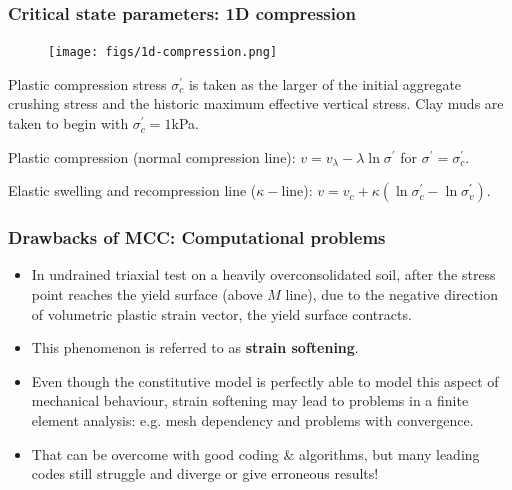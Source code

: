 \documentclass[notes]{beamer}
\begin{document}
\begin{frame}
	\frametitle{Critical state parameters: 1D compression}
	\begin{figure}
		\texttt{[image: figs/1d-compression.png]}
	\end{figure}
	Plastic compression stress $\sigma_c^\prime$ is taken as the larger of the initial aggregate crushing stress and the historic maximum effective vertical stress. Clay muds are taken to begin with $\sigma_c^\prime = 1$kPa.
	
	Plastic compression (normal compression line): $v = v_\lambda - \lambda \ln \sigma^\prime$ for $\sigma^\prime = \sigma^\prime_c$.
	
	Elastic swelling and recompression line ($\kappa-$line): $ v = v_c + \kappa (\ln \sigma_c^\prime - \ln \sigma_v^\prime)$. 
\end{frame}

\begin{frame}
\frametitle{Drawbacks of MCC: Computational problems}
\begin{itemize}
	\item In undrained triaxial test on a heavily overconsolidated soil, after the stress point reaches the yield surface (above $M$ line), due to the negative direction of volumetric plastic strain vector, the yield surface contracts.
	
	\item This phenomenon is referred to as \textbf{strain softening}.

	\item Even though the constitutive model is perfectly able to model this
	aspect of mechanical behaviour, strain softening may lead to problems in a finite element analysis: e.g. mesh dependency and problems with convergence.
	
	\item That can be overcome with good coding \& algorithms, but many leading codes still struggle and diverge or give erroneous results!
	
\end{itemize}
\end{frame}
\end{document}
